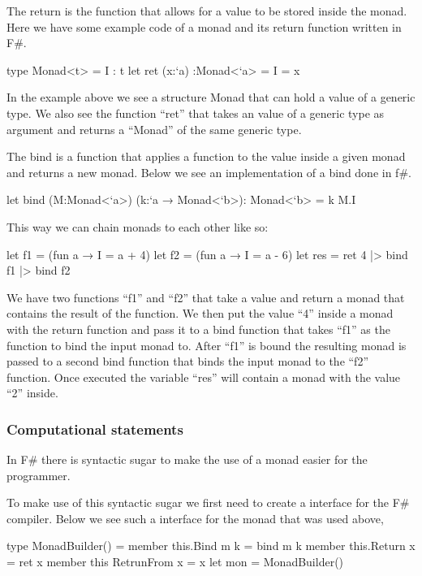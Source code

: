 The return is the function that allows for a value to be stored inside the monad. Here we have some example code of a monad and its return function written in F\#.

\begin{code}
	type Monad<t> = {I : t}
	let ret (x:`a) :Monad<`a> = {I = x}
\end{code}

In the example above we see a structure Monad that can hold a value of a generic type. We also see the function “ret” that takes an value of a generic type as argument and returns a “Monad” of the same generic type.

The bind is a function that applies a function to the value inside a given monad and returns a new monad. Below we see an implementation of a bind done in f\#.

\begin{code}
	let bind (M:Monad<`a>) (k:`a → Monad<`b>): Monad<`b> = k M.I
\end{code}

This way we can chain monads to each other like so:

\begin{code}
	let f1 = (fun a → {I = a + 4}) 
	let f2 = (fun a → {I = a - 6})       
	let res = ret 4 |>  bind f1 |> bind f2 
\end{code}

We have two functions “f1” and “f2” that take a value and return a monad that contains the result of the function. We then put the value “4” inside a monad with the return function and pass it to a bind function that takes “f1” as the function to bind the input monad to. After “f1” is bound the resulting monad is passed to a second bind function that binds the input monad to the “f2” function. Once executed the variable “res” will contain a monad with the value “2” inside.

\subsubsection{Computational statements}

In F\# there is syntactic sugar to make the use of a monad easier for the programmer. 

To make use of this syntactic sugar we first need to create a interface for the F\# compiler. Below we see such a interface for the monad that was used above,

\begin{code}
	type MonadBuilder() = 
		member this.Bind m k = bind m k
		member this.Return x = ret x
		member this RetrunFrom x = x
	let mon = MonadBuilder()
\end{code}


